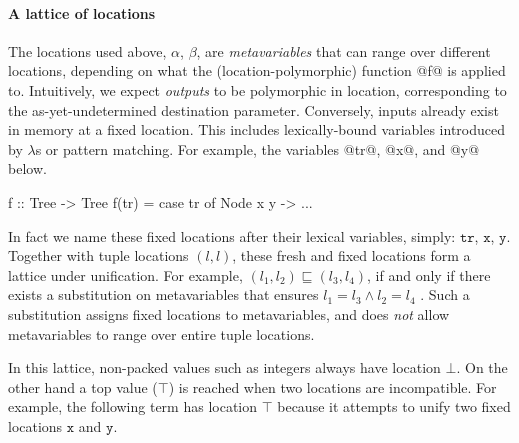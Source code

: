 \documentclass[a4paper,english]{lipics-v2016}
\newcommand{\fresh}[1]{\ensuremath{#1}}
\newcommand{\fixed}[1]{\ensuremath{\texttt{#1}}}
\newcommand{\freshA}{\fresh{\alpha}}
\newcommand{\freshB}{\fresh{\beta}}
\begin{document}
\paragraph*{A lattice of locations}

The locations used above, \freshA, \freshB, are {\em metavariables} that can range
over different locations, depending on what the (location-polymorphic) function
@f@ is applied to.
%
Intuitively, we expect {\em outputs} to be polymorphic in location,
corresponding to the as-yet-undetermined destination parameter.  Conversely,
inputs already exist in memory at a fixed location.
%
This includes lexically-bound variables introduced by $\lambda$s or
pattern matching.
For example, the variables @tr@, @x@, and @y@ below.

\begin{code}
f :: Tree -> Tree
f(tr) = case tr of Node x y -> ...
\end{code}

In fact we name these fixed locations after their lexical variables, simply:
\fixed{tr}, \fixed{x}, \fixed{y}.  Together with tuple locations $(l,l)$, these
fresh and fixed locations form a lattice under unification.
For example, $(l_1,l_2)\sqsubseteq (l_3,l_4)$, if and only if there exists a
substitution on metavariables that ensures $l_1 = l_3 \wedge l_2 = l_4$ .
%
Such a substitution assigns fixed locations to metavariables, and does {\em not}
allow metavariables to range over entire tuple locations.  


In this lattice, non-packed values such as integers always have location $\bot$.
On the other hand a
top value ($\top$) is reached
when two locations are incompatible.  For example, the following term has
location $\top$ because it attempts to unify two fixed locations \fixed{x} and \fixed{y}.
\end{document}
